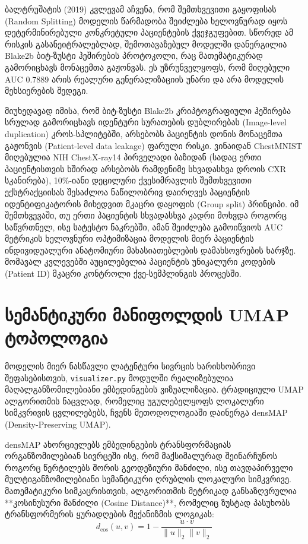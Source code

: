 \documentclass[12pt,a4paper,oneside]{report}
\begin{document}
ბალტრუშატის (2019) კვლევამ აჩვენა, რომ შემთხვევითი გაყოფისას (Random Splitting) მოდელის წარმადობა შეიძლება ხელოვნურად იყოს დეტერმინირებული კონკრეტული პაციენტების ქვეჯგუფებით. სწორედ ამ რისკის გასანეიტრალებლად, შემოთავაზებულ მოდელში დანერგილია Blake2b ბიტ-ზუსტი ჰეშირების პროტოკოლი, რაც მათემატიკურად გამორიცხავს მონაცემთა გაჟონვას. ეს უზრუნველყოფს, რომ მიღებული AUC 0.7889 არის რეალური გენერალიზაციის უნარი და არა მოდელის მეხსიერების შედეგი.

მიუხედავად იმისა, რომ ბიტ-ზუსტი Blake2b კრიპტოგრაფიული ჰეშირება სრულად გამორიცხავს იდენტური სურათების დუბლირებას (Image-level duplication) კროს-სპლიტებში, არსებობს პაციენტის დონის მონაცემთა გაჟონვის (Patient-level data leakage) ფარული რისკი. ვინაიდან ChestMNIST მიღებულია NIH ChestX-ray14 პირველადი ბაზიდან (სადაც ერთი პაციენტისთვის ხშირად არსებობს რამდენიმე სხვადასხვა დროის CXR სკანირება), 10\%-იანი დეცილური ქვესიმრავლის შემთხვევითი ექსტრაქციისას შესაძლოა ნაწილობრივ დაირღვეს პაციენტის იდენტიფიკატორის მიხედვით მკაცრი დაყოფის (Group split) პრინციპი. იმ შემთხვევაში, თუ ერთი პაციენტის სხვადასხვა კადრი მოხვდა როგორც საწვრთნელ, ისე სატესტო ნაკრებში, ამან შეიძლება გამოიწვიოს AUC მეტრიკის ხელოვნური ოპტიმიზაცია მოდელის მიერ პაციენტის ინდივიდუალური ანატომიური მახასიათებლების დამახსოვრების ხარჯზე. მომავალ კვლევებში აუცილებელია პაციენტის უნიკალური კოდების (Patient ID) მკაცრი კონტროლი ქვე-სემპლინგის პროცესში.

\section{სემანტიკური მანიფოლდის UMAP ტოპოლოგია}
მოდელის მიერ ნასწავლი ლატენტური სივრცის ხარისხობრივი შეფასებისთვის, \texttt{visualizer.py} მოდულში რეალიზებულია მაღალგანზომილებიანი ემბედინგების ვიზუალიზაცია. ტრადიციული UMAP ალგორითმის ნაცვლად, რომელიც უგულებელყოფს ლოკალური სიმკვრივის ცვლილებებს, ჩვენს მეთოდოლოგიაში დაინერგა densMAP (Density-Preserving UMAP). 

densMAP ახორციელებს ემბედინგების ტრანსფორმაციას ორგანზომილებიან სივრცეში ისე, რომ მაქსიმალურად შეინარჩუნოს როგორც წერტილებს შორის გეოდეზიური მანძილი, ისე თავდაპირველი მულტიგანზომილებიანი სემანტიკური ღრუბლის ლოკალური სიმკვრივე. მათემატიკური სიმკაცრისთვის, ალგორითმის მეტრიკად განსაზღვრულია **კოსინუსური მანძილი (Cosine Distance)**, რომელიც ზუსტად პასუხობს ტრანსფორმერის ყურადღების მექანიზმის ლოგიკას:
\begin{equation}
d_{\text{cos}}(u, v) = 1 - \frac{u \cdot v}{\|u\|_2 \|v\|_2}
\end{equation}
\end{document}
